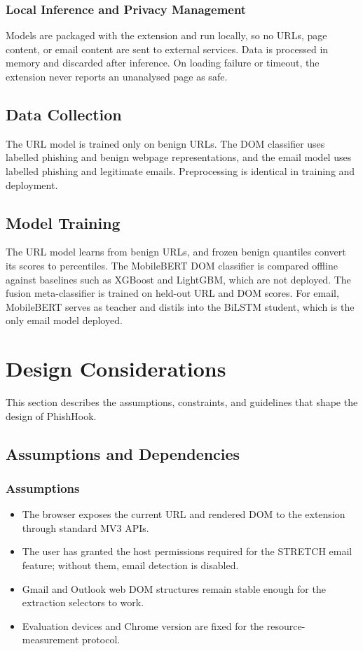 \documentclass{FastFyp}
\begin{document}
\subsubsection{Local Inference and Privacy Management}

Models are packaged with the extension and run locally, so no URLs, page content, or email content are sent to external services. Data is processed in memory and discarded after inference. On loading failure or timeout, the extension never reports an unanalysed page as safe.

\subsection{Data Collection}

The URL model is trained only on benign URLs. The DOM classifier uses labelled phishing and benign webpage representations, and the email model uses labelled phishing and legitimate emails. Preprocessing is identical in training and deployment.

\subsection{Model Training}

The URL model learns from benign URLs, and frozen benign quantiles convert its scores to percentiles. The MobileBERT DOM classifier is compared offline against baselines such as XGBoost and LightGBM, which are not deployed. The fusion meta-classifier is trained on held-out URL and DOM scores. For email, MobileBERT serves as teacher and distils into the BiLSTM student, which is the only email model deployed.
\section{Design Considerations}
\label{sec:design-considerations}

This section describes the assumptions, constraints, and guidelines that shape the design of PhishHook.

\subsection{Assumptions and Dependencies}

\subsubsection{Assumptions}
\begin{itemize}
    \item The browser exposes the current URL and rendered DOM to the extension through standard MV3 APIs.
    \item The user has granted the host permissions required for the STRETCH email feature; without them, email detection is disabled.
    \item Gmail and Outlook web DOM structures remain stable enough for the extraction selectors to work.
    \item Evaluation devices and Chrome version are fixed for the resource-measurement protocol.
\end{itemize}
\end{document}
